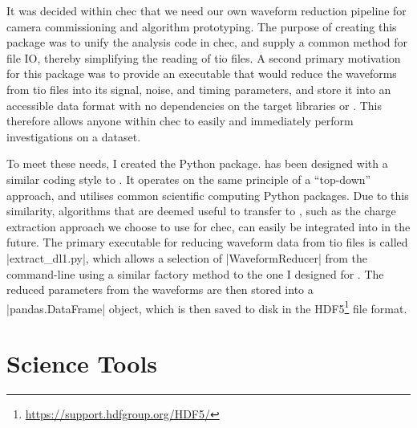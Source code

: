 \noindent It was decided within \gls{chec} that we need our own waveform reduction pipeline for camera commissioning and algorithm prototyping. The purpose of creating this package was to unify the analysis code in \gls{chec}, and supply a common method for file IO, thereby simplifying the reading of \gls{tio} files. A second primary motivation for this package was to provide an executable that would reduce the waveforms from \gls{tio} files into its signal, noise, and timing parameters, and store it into an accessible data format with no dependencies on the \gls{target} libraries or . This therefore allows anyone within \gls{chec} to easily and immediately perform investigations on a dataset.

To meet these needs, I created the  Python package.  has been designed with a similar coding style to . It operates on the same principle of a ``top-down'' approach, and utilises common scientific computing Python packages. Due to this similarity, algorithms that are deemed useful to transfer to , such as the charge extraction approach we choose to use for \gls{chec}, can easily be integrated into  in the future. The primary executable for reducing waveform data from \gls{tio} files is called |extract_dl1.py|, which allows a selection of |WaveformReducer| from the command-line using a similar factory method to the one I designed for . The reduced parameters from the waveforms are then stored into a |pandas.DataFrame| object, which is then saved to disk in the HDF5\footnote{\url{https://support.hdfgroup.org/HDF5/}} file format.

\section{Science Tools}

